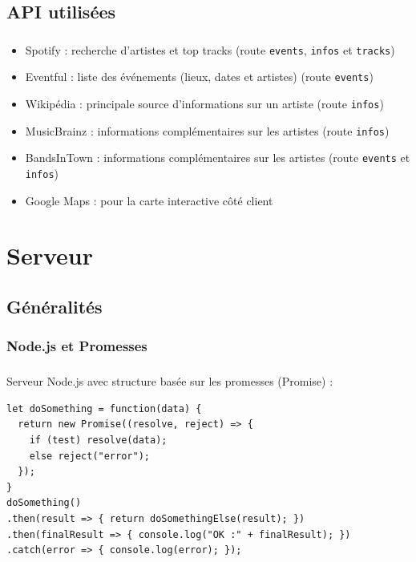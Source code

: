 \documentclass[10pt]{beamer}
\begin{document}
\subsection{API utilisées}
\begin{frame}
	\frametitle{\secname}
	\framesubtitle{\subsecname}
	\begin{itemize}
		\item Spotify : recherche d'artistes et top tracks (route \texttt{events}, \texttt{infos} et \texttt{tracks})
		\item Eventful : liste des événements (lieux, dates et artistes) (route \texttt{events})
		\item Wikipédia : principale source d'informations sur un artiste (route \texttt{infos})
        \item MusicBrainz : informations complémentaires sur les artistes (route \texttt{infos})
		\item BandsInTown : informations complémentaires sur les artistes (route \texttt{events} et \texttt{infos})
		\item Google Maps : pour la carte interactive côté client
	\end{itemize}
\end{frame}

\section{Serveur}
\subsection{Généralités}
\subsubsection{Node.js et Promesses}
\begin{frame}[fragile]
	\frametitle{\secname}
	\framesubtitle{\subsubsecname}
	Serveur Node.js avec structure basée sur les promesses (Promise) :
	\begin{verbatim}
let doSomething = function(data) {
  return new Promise((resolve, reject) => {
    if (test) resolve(data);
    else reject("error");
  });
}
doSomething()
.then(result => { return doSomethingElse(result); })
.then(finalResult => { console.log("OK :" + finalResult); })
.catch(error => { console.log(error); });
	\end{verbatim}
\end{frame}
\end{document}

